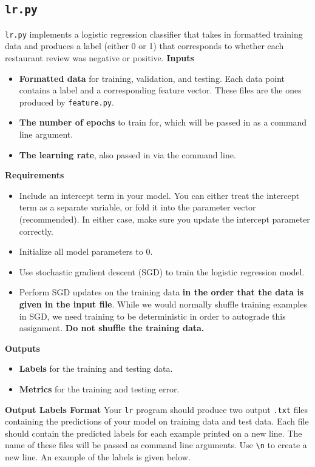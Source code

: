 \documentclass[11pt,addpoints,answers]{exam}
\begin{document}
\subsection{\texttt{lr.py}}\label{lrpy}

\lstinline{lr.py} implements a logistic regression classifier that takes in formatted training data and produces a label (either 0 or 1) that corresponds to whether each restaurant review was negative or positive.
{\bf Inputs }
\begin{itemize}
    \item \textbf{Formatted data} for training, validation, and testing. Each data point contains a label and a corresponding feature vector. These files are the ones produced by \lstinline{feature.py}.
    \item \textbf{The number of epochs} to train for, which will be passed in as a command line argument.
    \item \textbf{The learning rate}, also passed in via the command line.
\end{itemize}

{\bf Requirements }
\begin{itemize}
    \item Include an intercept term in your model. You can either treat the intercept term as a separate variable, or fold it into the parameter vector (recommended). In either case, make sure you update the intercept parameter correctly.
    \item Initialize all model parameters to 0.
    \item Use stochastic gradient descent (SGD) to train the logistic regression model.
    \item Perform SGD updates on the training data \textbf{in the order that the data is given in the input file}. While we would normally shuffle training examples in SGD, we need training to be deterministic in order to autograde this assignment. \textbf{Do not shuffle the training data.}
\end{itemize}

{\bf Outputs }
\begin{itemize}
    \item \textbf{Labels} for the training and testing data.
    \item \textbf{Metrics} for the training and testing error.
\end{itemize}

{\bf Output Labels Format }
Your \lstinline{lr} program should produce two output \texttt{.txt} files containing the predictions of your model on training data and test data. Each file should contain the predicted labels for each example printed on a new line. The name of these files will be passed as command line arguments. Use \lstinline{\n} to create a new line. An example of the labels is given below.
\end{document}
